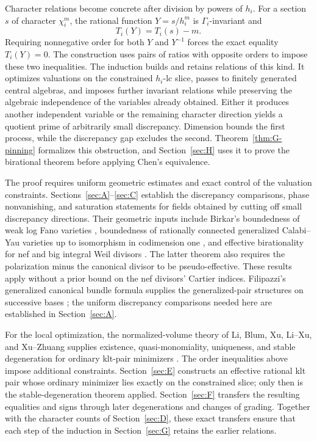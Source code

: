 Character relations become concrete after division by powers of $h_i$. For a section $s$ of character $\chi_i^m$, the rational function $Y=s/h_i^m$ is $\Gamma_i$-invariant and
\[
 T_i(Y)=T_i(s)-m.
\]
Requiring nonnegative order for both $Y$ and $Y^{-1}$ forces the exact equality $T_i(Y)=0$. The construction uses pairs of ratios with opposite orders to impose these two inequalities. The induction builds and retains relations of this kind. It optimizes valuations on the constrained $h_i$-lc slice, passes to finitely generated central algebras, and imposes further invariant relations while preserving the algebraic independence of the variables already obtained. Either it produces another independent variable or the remaining character direction yields a quotient prime of arbitrarily small discrepancy. Dimension bounds the first process, while the discrepancy gap excludes the second. Theorem~\ref{thm:G-pinning} formalizes this obstruction, and Section~\ref{sec:H} uses it to prove the birational theorem before applying Chen's equivalence.

The proof requires uniform geometric estimates and exact control of the valuation constraints. Sections~\mbox{\ref{sec:A}--\ref{sec:C}} establish the discrepancy comparisons, phase nonvanishing, and saturation statements for fields obtained by cutting off small discrepancy directions. Their geometric inputs include Birkar's boundedness of weak log Fano varieties \cite[Theorem~1.1]{BirkarBAB}, boundedness of rationally connected generalized Calabi--Yau varieties up to isomorphism in codimension one \cite[Theorem~1.7]{BirkarCY}, and effective birationality for nef and big integral Weil divisors \cite[Theorem~1.1]{BirkarPolarised}. The latter theorem also requires the polarization minus the canonical divisor to be pseudo-effective. These results apply without a prior bound on the nef divisors' Cartier indices. Filipazzi's generalized canonical bundle formula supplies the generalized-pair structures on successive bases \cite[Theorem~1.4]{Filipazzi}; the uniform discrepancy comparisons needed here are established in Section~\ref{sec:A}.

For the local optimization, the normalized-volume theory of Li, Blum, Xu, Li--Xu, and Xu--Zhuang supplies existence, quasi-monomiality, uniqueness, and stable degeneration for ordinary klt-pair minimizers \cite{LiIzumi,Blum,XuQuasimonomial,LiXuStable,XuZhuangUnique,XuZhuangStable}. The order inequalities above impose additional constraints. Section~\ref{sec:E} constructs an effective rational klt pair whose ordinary minimizer lies exactly on the constrained slice; only then is the stable-degeneration theorem applied. Section~\ref{sec:F} transfers the resulting equalities and signs through later degenerations and changes of grading. Together with the character counts of Section~\ref{sec:D}, these exact transfers ensure that each step of the induction in Section~\ref{sec:G} retains the earlier relations.

